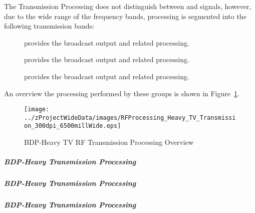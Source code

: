 The \RF Transmission Processing does not distinguish between \ATV and \DTV \RF signals, however, due to the wide range of the frequency bands, processing is segmented into the following transmission bands:
\begin{description}
	\item[\TVVHFLow] provides the \TVVHFLow broadcast output and related \RF processing.%
	\item[\TVVHFHigh] provides the \TVVHFHigh broadcast output and related \RF processing.%
	\item[\TVUHF] provides the \TVUHF broadcast output and related \RF processing.
\end{description}

An overview the processing performed by these groups is shown in Figure~\ref{fig:Heavy_RF_Processing_TV_Transmission}.
\begin{figure}[htbp]
	\centering
		\texttt{[image: ../zProjectWideData/images/RFProcessing\_Heavy\_TV\_Transmission\_300dpi\_6500millWide.eps]}
	\caption[BDP-Heavy TV RF Transmission Processing Overview]{BDP-Heavy TV RF Transmission Processing Overview}
	\label{fig:Heavy_RF_Processing_TV_Transmission}
\end{figure}

\subparagraph{BDP-Heavy \TVVHFLow \RF Transmission Processing}
\label{loc:BDP-Heavy_RF_TVVHFLo_Transmission}
\renewcommand{\ThisSubSegment}{BDP-Heavy \TVVHFLow RF\xspace}%


\subparagraph{BDP-Heavy \TVVHFHigh \RF Transmission Processing}
\label{loc:BDP-Heavy_RF_TVVHFHi_Transmission}
\renewcommand{\ThisSubSegment}{BDP-Heavy \TVVHFHigh RF\xspace}%


\subparagraph{BDP-Heavy \TVUHF \RF Transmission Processing}
\label{loc:BDP-Heavy_RF_TVUHF_Transmission}
\renewcommand{\ThisSubSegment}{BDP-Heavy \TVUHF RF\xspace}%

